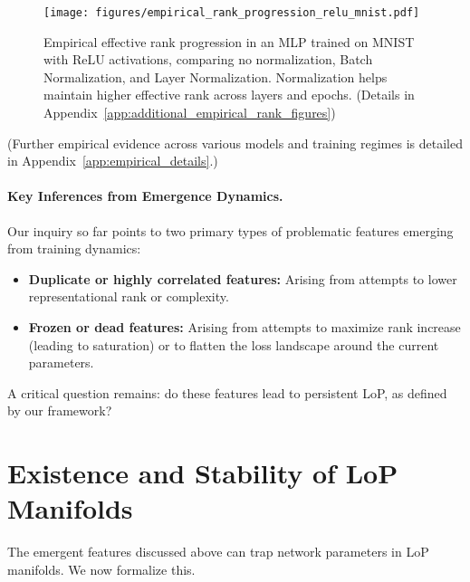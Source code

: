 \documentclass{article}
\begin{document}
\begin{figure}[ht!]
    \centering
    \texttt{[image: figures/empirical\_rank\_progression\_relu\_mnist.pdf]}
    \caption{Empirical effective rank progression in an MLP trained on MNIST with ReLU activations, comparing no normalization, Batch Normalization, and Layer Normalization. Normalization helps maintain higher effective rank across layers and epochs. (Details in Appendix~\ref{app:additional_empirical_rank_figures})}
    \label{fig:empirical_rank_progression_main}
\end{figure}

(Further empirical evidence across various models and training regimes is detailed in Appendix~\ref{app:empirical_details}.)

\paragraph{Key Inferences from Emergence Dynamics.}
Our inquiry so far points to two primary types of problematic features emerging from training dynamics:
\begin{itemize}
    \item \textbf{Duplicate or highly correlated features:} Arising from attempts to lower representational rank or complexity.
    \item \textbf{Frozen or dead features:} Arising from attempts to maximize rank increase (leading to saturation) or to flatten the loss landscape around the current parameters.
\end{itemize}
A critical question remains: do these features lead to persistent LoP, as defined by our framework?

\section{Existence and Stability of LoP Manifolds}
\label{sec:existence_lop_manifold}

The emergent features discussed above can trap network parameters in LoP manifolds. We now formalize this.
\end{document}
